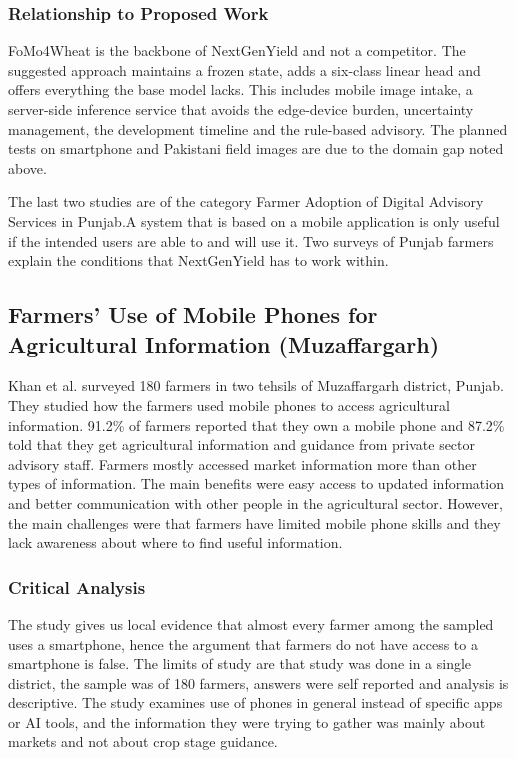\documentclass{FastFyp}
\begin{document}
\subsubsection{Relationship to Proposed Work}
FoMo4Wheat is the backbone of NextGenYield and not a competitor. The suggested approach maintains a frozen state, adds a six-class linear head and offers everything the base model lacks. This includes mobile image intake, a server-side inference service that avoids the edge-device burden, uncertainty management, the development timeline and the rule-based advisory. The planned tests on smartphone and Pakistani field images are due to the domain gap noted above.


The last two studies are of the category Farmer Adoption of Digital Advisory Services in Punjab.A system that is based on a mobile application is only useful if the intended users are able to and will use it. Two surveys of Punjab farmers explain the conditions that NextGenYield has to work within.

\subsection{Farmers' Use of Mobile Phones for Agricultural Information (Muzaffargarh)}

Khan et al. \cite{ref:Khan:2019}  surveyed 180 farmers in two tehsils of Muzaffargarh district, Punjab. They studied how the farmers used mobile phones to access agricultural information. 91.2\% of farmers reported that they own a mobile phone and 87.2\% told that they get agricultural information and guidance from private sector advisory staff. Farmers mostly accessed market information more than other types of information. The main benefits were easy access to updated information and better communication with other people in the agricultural sector. However, the main challenges were that farmers have limited mobile phone skills and they lack awareness about where to find useful information.

\subsubsection{Critical Analysis}
The study gives us local evidence that almost every farmer among the sampled uses a smartphone, hence the argument that farmers do not have access to a smartphone is false. The limits of study are that study was done in a single district, the sample was of 180 farmers, answers were self reported and analysis is descriptive. The study examines use of phones in general instead of specific apps or AI tools, and the information they were trying to gather was mainly about markets and not about crop stage guidance.
\end{document}
